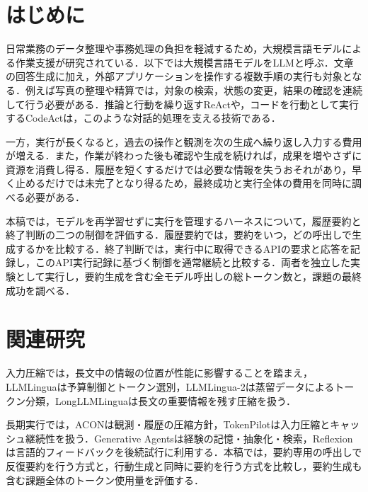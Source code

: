\documentclass[letter]{ieicej}
\begin{document}
\maketitle



\section{はじめに}

日常業務のデータ整理や事務処理の負担を軽減するため，大規模言語モデルによる作業支援が研究されている．以下では大規模言語モデルをLLMと呼ぶ．文章の回答生成に加え，外部アプリケーションを操作する複数手順の実行も対象となる．例えば写真の整理や精算では，対象の検索，状態の変更，結果の確認を連続して行う必要がある．推論と行動を繰り返すReAct\cite{yao2023react}や，コードを行動として実行するCodeAct\cite{wang2024codeact}は，このような対話的処理を支える技術である．

一方，実行が長くなると，過去の操作と観測を次の生成へ繰り返し入力する費用が増える．また，作業が終わった後も確認や生成を続ければ，成果を増やさずに資源を消費し得る．履歴を短くするだけでは必要な情報を失うおそれがあり，早く止めるだけでは未完了となり得るため，最終成功と実行全体の費用を同時に調べる必要がある．

本稿では，モデルを再学習せずに実行を管理するハーネスについて，履歴要約と終了判断の二つの制御を評価する．履歴要約では，要約をいつ，どの呼出しで生成するかを比較する．終了判断では，実行中に取得できるAPIの要求と応答を記録し，このAPI実行記録に基づく制御を通常継続と比較する．両者を独立した実験として実行し，要約生成を含む全モデル呼出しの総トークン数と，課題の最終成功を調べる．

\section{関連研究}

入力圧縮では，長文中の情報の位置が性能に影響すること\cite{liu2024lost}を踏まえ，LLMLingua\cite{jiang2023llmlingua}は予算制御とトークン選別，LLMLingua-2\cite{pan2024llmlingua2}は蒸留データによるトークン分類，LongLLMLingua\cite{jiang2024longllmlingua}は長文の重要情報を残す圧縮を扱う．

長期実行では，ACON\cite{kang2026acon}は観測・履歴の圧縮方針，TokenPilot\cite{xu2026tokenpilot}は入力圧縮とキャッシュ継続性を扱う．Generative Agents\cite{park2023generative}は経験の記憶・抽象化・検索，Reflexion\cite{shinn2023reflexion}は言語的フィードバックを後続試行に利用する．本稿では，要約専用の呼出しで反復要約を行う方式と，行動生成と同時に要約を行う方式を比較し，要約生成も含む課題全体のトークン使用量を評価する．
\end{document}
